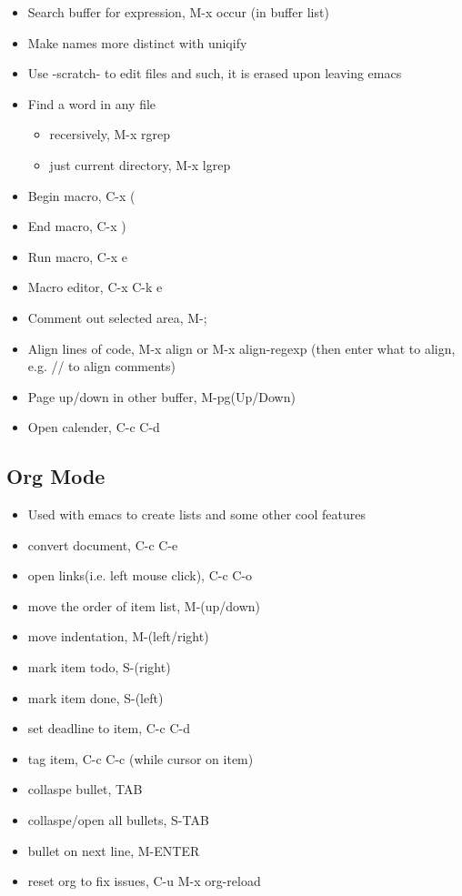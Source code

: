\documentclass[11pt]{article}
\begin{document}
\begin{itemize}
\item Search buffer for expression, M-x occur (in buffer list)
\item Make names more distinct with uniqify
\item Use -scratch- to edit files and such, it is erased upon leaving emacs
\item Find a word in any file
\begin{itemize}
\item recersively, M-x rgrep
\item just current directory, M-x lgrep
\end{itemize}
\item Begin macro, C-x (
\item End macro, C-x )
\item Run macro, C-x e
\item Macro editor, C-x C-k e
\item Comment out selected area, M-;
\item Align lines of code, M-x align or M-x align-regexp (then enter what to align, e.g. // to align comments)
\item Page up/down in other buffer, M-pg(Up/Down)
\item Open calender, C-c C-d
\end{itemize}
\subsection{Org Mode}
\label{sec:org526cf3d}
\begin{itemize}
\item Used with emacs to create lists and some other cool features
\item convert document, C-c C-e
\item open links(i.e. left mouse click), C-c C-o
\item move the order of item list, M-(up/down)
\item move indentation, M-(left/right)
\item mark item todo, S-(right)
\item mark item done, S-(left)
\item set deadline to item, C-c C-d
\item tag item, C-c C-c (while cursor on item)
\item collaspe bullet, TAB
\item collaspe/open all bullets, S-TAB
\item bullet on next line, M-ENTER
\item reset org to fix issues, C-u M-x org-reload
\end{itemize}
\end{document}
